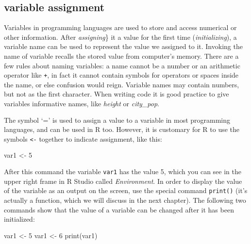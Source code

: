 \documentclass[
  letterpaper,
  DIV=11,
  numbers=noendperiod]{scrreprt}
\newenvironment{Shaded}{\begin{snugshade}}{\end{snugshade}}
\newcommand{\DecValTok}[1]{\textcolor[rgb]{0.68,0.00,0.00}{#1}}
\newcommand{\FunctionTok}[1]{\textcolor[rgb]{0.28,0.35,0.67}{#1}}
\newcommand{\NormalTok}[1]{\textcolor[rgb]{0.00,0.23,0.31}{#1}}
\newcommand{\OtherTok}[1]{\textcolor[rgb]{0.00,0.23,0.31}{#1}}
\begin{document}
\hypertarget{variable-assignment}{%
\subsection{variable assignment}\label{variable-assignment}}

Variables in programming languages are used to store and access
numerical or other information. After
\emph{assigning}\} it a value for the first
time (\emph{initializing}), a variable name can be used to represent the
value we assigned to it. Invoking the name of variable recalls the
stored value from computer's memory. There are a few rules about naming
variables: a name cannot be a number or an arithmetic operator like
\texttt{+}, in fact it cannot contain symbols for operators or spaces
inside the name, or else confusion would reign. Variable names may
contain numbers, but not as the first character. When writing code it is
good practice to give variables informative names, like \emph{height} or
\emph{city\_pop}. 

The symbol `=' is used to assign a value to a variable in most
programming languages, and can be used in R too. However, it is
customary for R to use the symbols \texttt{\textless{}-} together to
indicate assignment, like this:

\begin{Shaded}
\begin{Highlighting}[]
\NormalTok{var1 }\OtherTok{\textless{}{-}} \DecValTok{5}
\end{Highlighting}
\end{Shaded}

After this command the variable \texttt{var1} has the value 5, which you
can see in the upper right frame in R Studio called \emph{Environment}.
In order to display the value of the variable as an output on the
screen, use the special command \texttt{print()} (it's actually a
function, which we will discuss in the next chapter). The following two
commands show that the value of a variable can be changed after it has
been initialized:

\begin{Shaded}
\begin{Highlighting}[]
\NormalTok{var1 }\OtherTok{\textless{}{-}} \DecValTok{5}
\NormalTok{var1 }\OtherTok{\textless{}{-}} \DecValTok{6}
\FunctionTok{print}\NormalTok{(var1)}
\end{Highlighting}
\end{Shaded}
\end{document}
